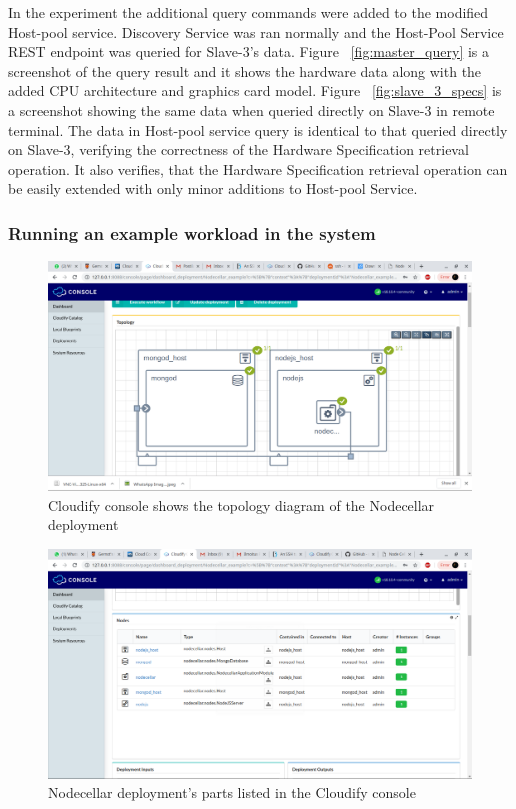 In the experiment the additional query commands were added to the modified Host-pool service. Discovery Service was ran normally and the Host-Pool Service REST endpoint was queried for Slave-3's data. Figure ~\ref{fig:master_query} is a screenshot of the query result and it shows the hardware data along with the added CPU architecture and graphics card model. Figure ~\ref{fig:slave_3_specs} is a screenshot showing the same data when queried directly on Slave-3 in remote terminal. The data in Host-pool service query is identical to that queried directly on Slave-3, verifying the correctness of the Hardware Specification retrieval operation. It also verifies, that the Hardware Specification retrieval operation can be easily extended with only minor additions to Host-pool Service.


\subsubsection{Running an example workload in the system}

 \begin{figure}[ht!]
\centering
  \includegraphics[width=\textwidth, keepaspectratio]{consoletopology.png}%
  \caption{Cloudify console shows the topology diagram of the Nodecellar deployment}
  \label{fig:console_topology}
\end{figure}

 \begin{figure}[ht!]
\centering
  \includegraphics[width=\textwidth, keepaspectratio]{console_list.png}%
  \caption{Nodecellar deployment's parts listed in the Cloudify console}
  \label{fig:console_list}
\end{figure}

